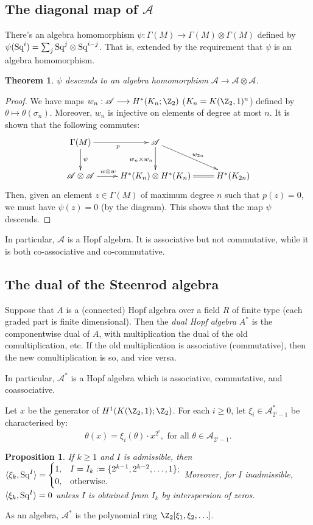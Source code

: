 \documentclass[11pt]{article}
\newcommand{\Squ}{\textup{Sq}}
\theoremstyle{plain}
\newtheorem*{thm*}{Theorem}
\newtheorem*{prop*}{Proposition}
\theoremstyle{definition}
\renewcommand{\to}{\longrightarrow}
\renewcommand{\mapsto}{\longmapsto}
\newcommand{\Steen}{\mathscr{A}}
\begin{document}
\subsection{The diagonal map of $\Steen$}
There's an algebra homomorphism $\psi:\Gamma(M)\to\Gamma(M)\otimes\Gamma(M)$ defined by $\psi(\Squ^i)=\sum_j \Squ^j\otimes\Squ^{i-j}$. That is, extended by the requirement that $\psi$ is an algebra homomorphism.
\begin{thm*}
$\psi$ descends to an algebra homomorphism $\Steen\to\Steen\otimes\Steen$.
\end{thm*}
\begin{proof}
We have maps $w_n:\Steen\to H^*(K_n;\Z_2)$ ($K_n=K(\Z_2,1)^n$) defined by $\theta\mapsto\theta(\sigma_n)$. Moreover, $w_n$ is injective on elements of degree at most $n$. It is shown  that the following commutes:
\[\xymatrix{
\Gamma(M)\ar[r]_p\ar[d]^\psi&\Steen\ar[d]_{w_n\times w_n}\ar[rd]^{w_{2n}}\\
\Steen\otimes\Steen\ar[r]^{w\otimes w\qquad \ }&H^*(K_n)\otimes H^*(K_n)\ar@{=}[r]&H^*(K_{2n})
}\]
Then, given an element $z\in\Gamma(M)$ of maximum degree $n$ such that $p(z)=0$, we must have $\psi(z)=0$ (by the diagram). This shows that the map $\psi$ descends.%
\end{proof}
In particular, $\Steen$ is a Hopf algebra. It is associative but not commutative, while it is both co-associative and co-commutative.
\subsection{The dual of the Steenrod algebra}
Suppose that $A$ is a (connected) Hopf algebra over a field $R$ of finite type (each graded part is finite dimensional). Then the \emph{dual Hopf algebra} $A^*$ is the componentwise dual of $A$, with multiplication the dual of the old comultiplication, etc. If the old multiplication is associative (commutative), then the new comultiplication is so, and vice versa.

In particular, $\Steen^*$ is a Hopf algebra which is associative, commutative, and coassociative.

Let $x$ be the generator of $H^1(K(\Z_2,1);\Z_2)$. For each $i\geq0$, let $\xi_i\in\Steen^*_{2^i-1}$ be characterised by:
\[\theta(x)=\xi_i(\theta)\cdot x^{2^i},\text{ for all }\theta\in\Steen_{2^i-1}.\]
\begin{prop*}
If $k\geq1$ and $I$ is admissible, then $\langle\xi_k,\Squ^I\rangle=\begin{cases}1,&I=I_k:=\{2^{k-1},2^{k-2},\ldots,1\};\\0,&\textup{otherwise.}\end{cases}$ Moreover, for $I$ inadmissible, $\langle\xi_k,\Squ^I\rangle=0$ unless $I$ is obtained from $I_k$ by interspersion of zeros.
\end{prop*}
As an algebra, $\Steen^*$ is the polynomial ring $\Z_2[\xi_1,\xi_2,\ldots]$.
\end{document}
